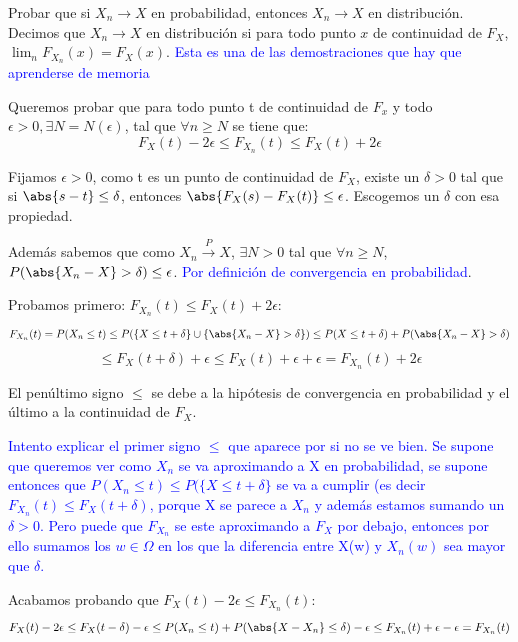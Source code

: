 \begin{problem}[4]Probar que si $X_n\to  X$ en  probabilidad, entonces $X_n\to  X$ en distribuci\'on. Decimos que
 $X_n\to  X$ en distribuci\'on si para todo punto $x$ de continuidad de $F_X$, $\lim_n F_{X_n} (x) = F_X (x)$.
\solution
\textcolor{blue}{Esta es una de las demostraciones que hay que aprenderse de memoria}


Queremos probar que para todo punto t de continuidad de $F_x$ y todo $\epsilon >0, \exists N=N(\epsilon)$, tal que $\forall n \geq N$ se tiene que:
\[
F_X(t)-2\epsilon \leq F_{X_n}(t) \leq F_X(t)+2\epsilon
\]

Fijamos $\epsilon>0$, como t es un punto de continuidad de $F_X$, existe un $\delta>0$ tal que si $\abs{s-t}\leq \delta$, entonces $\abs{F_X(s)-F_X(t)} \leq \epsilon$. Escogemos un $\delta$ con esa propiedad.

Además sabemos que como $X_n \stackrel{P}{\rightarrow} X$, $\exists N>0$ tal que $\forall n \geq N$, $P(\abs{X_n -X}>\delta)\leq \epsilon$. \textcolor{blue}{Por definición de convergencia en probabilidad}.

Probamos primero: $F_{X_n}(t) \leq F_X(t)+2\epsilon$:
\[
F_{X_n}(t) = P(X_n \leq t) \leq P(\{X \leq t+\delta\} \cup \{\abs{X_n -X} > \delta\}) \leq P(X \leq t+\delta)+ P(\abs{X_n -X} > \delta)
\]
\[
\leq F_X(t+\delta)+\epsilon \leq F_X(t)+\epsilon+\epsilon = F_{X_n}(t) + 2\epsilon
\]

El penúltimo signo $\leq$ se debe a la hipótesis de convergencia en probabilidad y el último a la continuidad de $F_X$.

\textcolor{blue}{Intento explicar el primer signo $\leq$ que aparece por si no se ve bien. Se supone que queremos ver como $X_n$ se va aproximando a X en probabilidad, se supone entonces que $P(X_n \leq t) \leq P(\{X \leq t+\delta\}$ se va a cumplir (es decir $F_{X_n}(t) \leq F_X(t+\delta)$, porque X se parece a $X_n$ y además estamos sumando un $\delta >0$. Pero puede que $F_{X_n}$ se este aproximando a $F_X$ por debajo, entonces por ello sumamos los $w \in \Omega$ en los que la diferencia entre X(w) y $X_n(w)$ sea mayor que $\delta$.}

Acabamos probando que $F_X(t)-2\epsilon \leq F_{X_n}(t)$:
\[
F_X(t)-2\epsilon \leq F_X(t-\delta)-\epsilon \leq P(X_n \leq t)+ P(\abs{X -X_n} \leq \delta) - \epsilon \leq F_{X_n}(t) + \epsilon - \epsilon  = F_{X_n}(t)
\]

\end{problem}

